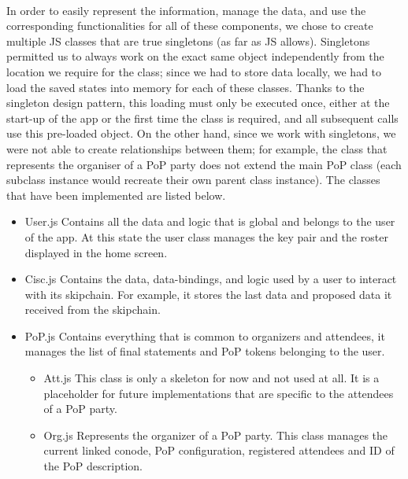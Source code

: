 \paragraph{}
In order to easily represent the information, manage the data, and use the corresponding functionalities for all of these components, we chose to create multiple JS classes that are true singletons (as far as JS allows). Singletons permitted us to always work on the exact same object independently from the location we require for the class; since we had to store data locally, we had to load the saved states into memory for each of these classes. Thanks to the singleton design pattern, this loading must only be executed once, either at the start-up of the app or the first time the class is required, and all subsequent calls use this pre-loaded object. On the other hand, since we work with singletons, we were not able to create relationships between them; for example, the class that represents the organiser of a PoP party does not extend the main PoP class (each subclass instance would recreate their own parent class instance). The classes that have been implemented are listed below.

\begin{itemize}
\item User.js \linebreak Contains all the data and logic that is global and belongs to the user of the app. At this state the user class manages the key pair and the roster displayed in the home screen.

\item Cisc.js \linebreak Contains the data, data-bindings, and logic used by a user to interact with its skipchain. For example, it stores the last data and 
proposed data it received from the skipchain.

\item PoP.js \linebreak Contains everything that is common to organizers and attendees, it manages the list of final statements and PoP tokens belonging to the user.
\begin{itemize}
\item Att.js \linebreak This class is only a skeleton for now and not used at all. It is a placeholder for future implementations that are specific to the attendees of a PoP party.

\item Org.js \linebreak Represents the organizer of a PoP party. This class manages the current linked conode, PoP configuration, registered attendees and ID of the PoP description.
\end{itemize}
\end{itemize}


